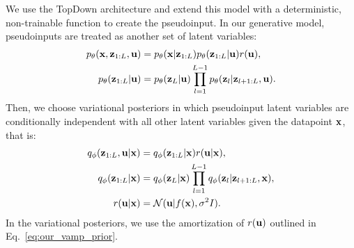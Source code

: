 We use the TopDown architecture and extend this model with a deterministic, non-trainable function to create the pseudoinput. In our generative model, pseudoinputs are treated as another set of latent variables:
\begin{align}
    p_{\theta}({\mathbf{x}}, {\mathbf{z}}_{1:L}, {\mathbf{u}}) &= p_{\theta}({\mathbf{x}}| {\mathbf{z}}_{1:L})p_{\theta}({\mathbf{z}}_{1:L}|{\mathbf{u}})r({\mathbf{u}}), \\
    p_{\theta}({\mathbf{z}}_{1:L}|{\mathbf{u}}) &= p_{\theta}({\mathbf{z}}_L |{\mathbf{u}}) \prod_{l=1}^{L-1} p_{\theta}({\mathbf{z}}_l |{\mathbf{z}}_{l+1:L},  {\mathbf{u}}).
\end{align}
Then, we choose variational posteriors in which pseudoinput latent variables are conditionally independent with all other latent variables given the datapoint ${\mathbf{x}}$, that is:
\begin{align}
    q_{\phi}({\mathbf{z}}_{1:L}, {\mathbf{u}}| {\mathbf{x}}) &= q_{\phi}({\mathbf{z}}_{1:L}| {\mathbf{x}})r({\mathbf{u}}| {\mathbf{x}}),  \\
    q_{\phi}({\mathbf{z}}_{1:L}| {\mathbf{x}})  & = q_{\phi}({\mathbf{z}}_L |{\mathbf{x}}) \prod_{l=1}^{L-1} q_{\phi}({\mathbf{z}}_l |{\mathbf{z}}_{l+1:L},  {\mathbf{x}}),\\
    r({\mathbf{u}}| {\mathbf{x}}) & = \mathcal{N}({\mathbf{u}} | f({\mathbf{x}}), \sigma^2 I).
\end{align}
In the variational posteriors, we use the amortization of $r({\mathbf{u}})$ outlined in Eq.~\ref{eq:our_vamp_prior}.

